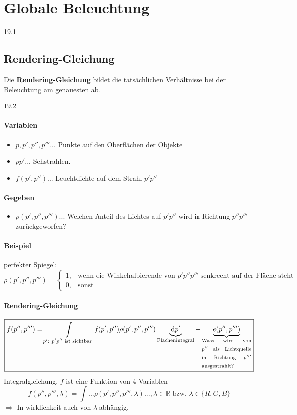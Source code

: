 \section{Globale Beleuchtung}
\begin{center}
 19.1
\end{center}
\subsection{Rendering-Gleichung}
Die \textbf{Rendering-Gleichung} bildet die tatsächlichen Verhältnisse bei der Beleuchtung am genauesten ab.
\begin{center}
 19.2
\end{center}
\paragraph*{Variablen}
\begin{itemize}
 \item $p, p', p'', p'''...$ Punkte auf den Oberflächen der Objekte
 \item $\overline{pp'}...$ Sehstrahlen.
 \item $f(p',p'')...$ Leuchtdichte auf dem Strahl $p'p''$
\end{itemize}
\paragraph*{Gegeben}
\begin{itemize}
 \item $\rho(p',p'',p''')...$ Welchen Anteil des Lichtes auf $p'p''$ wird in Richtung $p''p'''$ zurückgeworfen?
\end{itemize}
\paragraph{Beispiel} perfekter Spiegel:
	\[
		\rho(p',p'',p''') = \begin{cases}
		                     1,& \text{wenn die Winkehalbierende von $p'p''p'''$ senkrecht auf der Fläche steht}\\
		                     0,& \text{sonst}
		                    \end{cases}
	\]
\paragraph{Rendering-Gleichung}
\[\boxed{f(p'',p''') = \int\limits_{p'{:}\ \text{$p'p''$ ist sichtbar}} f(p',p'') \rho(p',p'',p''')
	\underbrace{\mathrm{d}p'}_{\text{Flächenintegral}}
	+ \underbrace{e(p'',p''')}_{
		\text{\begin{minipage}{2.5cm}
			Wass wird von $p''$ als Lichtquelle in Richtung $p'''$ ausgestrahlt?
		\end{minipage}}}}
\]
Integralgleichung. $f$ ist eine Funktion von 4 Variablen
\[f(p'',p''',\lambda) = \int ... \rho(p',p'',p''',\lambda) ..., \lambda \in \mathbb{R} \text{ bzw. } \lambda \in \{R,G,B\}\]
$\Rightarrow$ In wirklichkeit auch von $\lambda$ abhängig.
